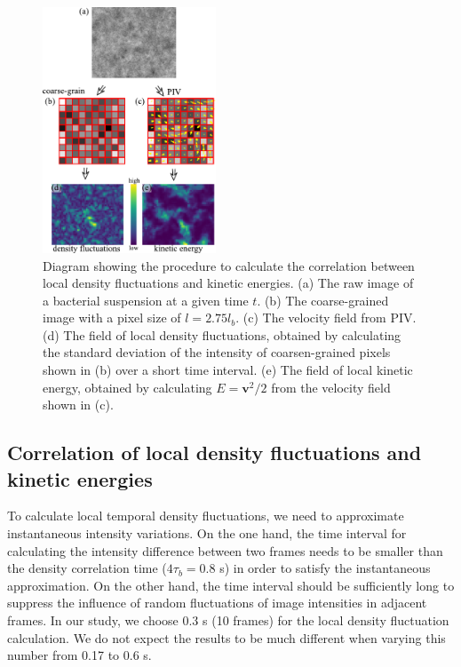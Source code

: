 \documentclass[twocolumn,aps,prx,amsmath,amssymb,longbibliography,superscriptaddress]{revtex4-2}
\begin{document}
\begin{figure}[t]
	\begin{center}
		\includegraphics[width=0.46\textwidth]{Figures/fig-9.pdf}
		\caption[Density autocorrelation]
		{
			Diagram showing the procedure to calculate the correlation between local density fluctuations and kinetic energies. (a) The raw image of a bacterial suspension at a given time $t$. (b) The coarse-grained image with a pixel size of $l=2.75l_b$. (c) The velocity field from PIV. (d) The field of local density fluctuations, obtained by calculating the standard deviation of the intensity of coarsen-grained pixels shown in (b) over a short time interval. (e) The field of local kinetic energy, obtained by calculating $E = \bm{v}^2/2$ from the velocity field shown in (c).
 		}
		\label{fig:coupling-calculation}
	\end{center}
\end{figure}

\subsection{Correlation of local density fluctuations and kinetic energies} \label{appendix-IA-localcorrelation}

To calculate local temporal density fluctuations, we need to approximate instantaneous intensity variations. On the one hand, the time interval for calculating the intensity difference between two frames needs to be smaller than the density correlation time ($4\tau_b = 0.8$ s) in order to satisfy the instantaneous approximation. On the other hand, the time interval should be sufficiently long to suppress the influence of random fluctuations of image intensities in adjacent frames. In our study, we choose 0.3 s (10 frames) for the local density fluctuation calculation. We do not expect the results to be much different when varying this number from 0.17 to 0.6 s.
\end{document}
